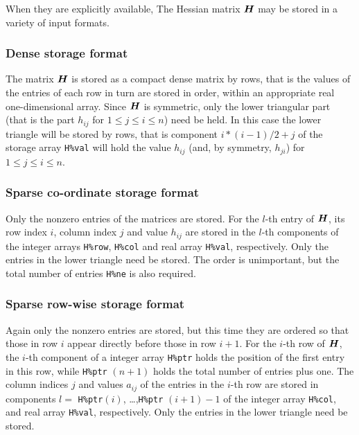\documentclass{galahad}
\begin{document}

\galmatrix
When they are explicitly available,
The Hessian matrix ${\bm{H}}$ may be stored in a variety of input formats.

\subsubsection{Dense storage format}\label{dense}
The matrix ${\bm{H}}$ is stored as a compact dense matrix by rows,
that is the values of the entries of each row in turn are
stored in order, within an appropriate real one-dimensional array.
Since ${\bm{H}}$ is symmetric, only the lower triangular part (that is the part
$h_{ij}$ for $1 \leq j \leq i \leq n$) need be held. In this case
the lower triangle will be stored by rows, that is
component $i \ast (i-1)/2 + j$ of the storage array {\tt H\%val}
will hold the value $h_{ij}$ (and, by symmetry, $h_{ji}$)
for $1 \leq j \leq i \leq n$.

\subsubsection{Sparse co-ordinate storage format}\label{coordinate}
Only the nonzero entries of the matrices are stored. For the
$l$-th entry of ${\bm{H}}$, its row index $i$, column index $j$
and value $h_{ij}$
are stored in the $l$-th components of the integer arrays {\tt H\%row},
{\tt H\%col} and real array {\tt H\%val}, respectively.
Only the entries in the lower triangle need be stored.
The order is unimportant, but the total
number of entries {\tt H\%ne} is also required.

\subsubsection{Sparse row-wise storage format}\label{rowwise}
Again only the nonzero entries are stored, but this time
they are ordered so that those in row $i$ appear directly before those
in row $i+1$. For the $i$-th row of ${\bm{H}}$, the $i$-th component of a
integer array {\tt H\%ptr} holds the position of the first entry in this row,
while {\tt H\%ptr} $(n+1)$ holds the total number of entries plus one.
The column indices $j$ and values $a_{ij}$ of the entries in the $i$-th row
are stored in components
$l =$ {\tt H\%ptr}$(i)$, \ldots ,{\tt H\%ptr} $(i+1)-1$ of the
integer array {\tt H\%col}, and real array {\tt H\%val}, respectively.
Only the entries in the lower triangle need be stored.
\end{document}
